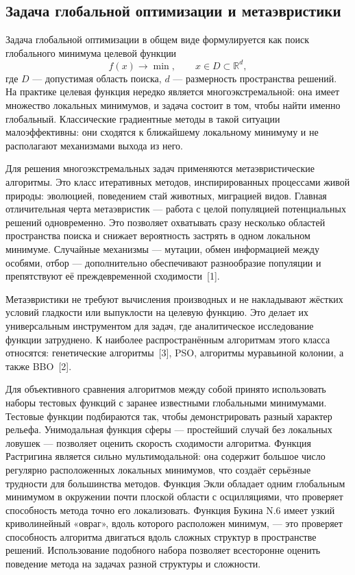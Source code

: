 \documentclass[14pt, russian]{scrartcl}
\begin{document}
\subsection{Задача глобальной оптимизации и метаэвристики}

Задача глобальной оптимизации в общем виде формулируется как поиск
глобального минимума целевой функции
\begin{equation}
    f(x) \to \min, \qquad x \in D \subset \mathbb{R}^{d},
\end{equation}
где $D$ --- допустимая область поиска, $d$ --- размерность пространства
решений. На практике целевая функция нередко является многоэкстремальной:
она имеет множество локальных минимумов, и задача состоит в том, чтобы
найти именно глобальный. Классические градиентные методы в такой ситуации
малоэффективны: они сходятся к ближайшему локальному минимуму и не
располагают механизмами выхода из него.

Для решения многоэкстремальных задач применяются метаэвристические
алгоритмы. Это класс итеративных методов, инспирированных процессами
живой природы: эволюцией, поведением стай животных, миграцией видов.
Главная отличительная черта метаэвристик --- работа с целой популяцией
потенциальных решений одновременно. Это позволяет охватывать сразу
несколько областей пространства поиска и снижает вероятность застрять в
одном локальном минимуме. Случайные механизмы --- мутации, обмен
информацией между особями, отбор --- дополнительно обеспечивают
разнообразие популяции и препятствуют её преждевременной сходимости~[1].

Метаэвристики не требуют вычисления производных и не накладывают жёстких
условий гладкости или выпуклости на целевую функцию. Это делает их
универсальным инструментом для задач, где аналитическое исследование
функции затруднено. К наиболее распространённым алгоритмам этого класса
относятся: генетические алгоритмы~[3], PSO, алгоритмы муравьиной колонии, а также BBO~[2].

Для объективного сравнения алгоритмов между собой принято использовать
наборы тестовых функций с заранее известными глобальными минимумами.
Тестовые функции подбираются так, чтобы демонстрировать разный характер
рельефа. Унимодальная функция сферы --- простейший случай без локальных
ловушек --- позволяет оценить скорость сходимости алгоритма. Функция
Растригина является сильно мультимодальной: она содержит большое число
регулярно расположенных локальных минимумов, что создаёт серьёзные
трудности для большинства методов. Функция Экли обладает одним глобальным
минимумом в окружении почти плоской области с осцилляциями, что проверяет
способность метода точно его локализовать. Функция Букина N.6 имеет
узкий криволинейный «овраг», вдоль которого расположен минимум, --- это
проверяет способность алгоритма двигаться вдоль сложных структур в
пространстве решений. Использование подобного набора позволяет
всесторонне оценить поведение метода на задачах разной структуры и
сложности.
\end{document}
